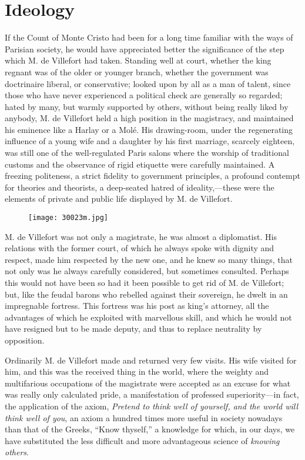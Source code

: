 \chapter{Ideology}

If the Count of Monte Cristo had been for a long time familiar with the
ways of Parisian society, he would have appreciated better the
significance of the step which M. de Villefort had taken. Standing well
at court, whether the king regnant was of the older or younger branch,
whether the government was doctrinaire liberal, or conservative; looked
upon by all as a man of talent, since those who have never experienced
a political check are generally so regarded; hated by many, but warmly
supported by others, without being really liked by anybody, M. de
Villefort held a high position in the magistracy, and maintained his
eminence like a Harlay or a Molé. His drawing-room, under the
regenerating influence of a young wife and a daughter by his first
marriage, scarcely eighteen, was still one of the well-regulated Paris
salons where the worship of traditional customs and the observance of
rigid etiquette were carefully maintained. A freezing politeness, a
strict fidelity to government principles, a profound contempt for
theories and theorists, a deep-seated hatred of ideality,—these were
the elements of private and public life displayed by M. de Villefort.

\begin{figure}[ht]
\texttt{[image: 30023m.jpg]}
\end{figure}

M. de Villefort was not only a magistrate, he was almost a diplomatist.
His relations with the former court, of which he always spoke with
dignity and respect, made him respected by the new one, and he knew so
many things, that not only was he always carefully considered, but
sometimes consulted. Perhaps this would not have been so had it been
possible to get rid of M. de Villefort; but, like the feudal barons who
rebelled against their sovereign, he dwelt in an impregnable fortress.
This fortress was his post as king’s attorney, all the advantages of
which he exploited with marvellous skill, and which he would not have
resigned but to be made deputy, and thus to replace neutrality by
opposition.

Ordinarily M. de Villefort made and returned very few visits. His wife
visited for him, and this was the received thing in the world, where
the weighty and multifarious occupations of the magistrate were
accepted as an excuse for what was really only calculated pride, a
manifestation of professed superiority—in fact, the application of the
axiom, \textit{Pretend to think well of yourself, and the world will think
well of you}, an axiom a hundred times more useful in society nowadays
than that of the Greeks, “Know thyself,” a knowledge for which, in our
days, we have substituted the less difficult and more advantageous
science of \textit{knowing others}.

